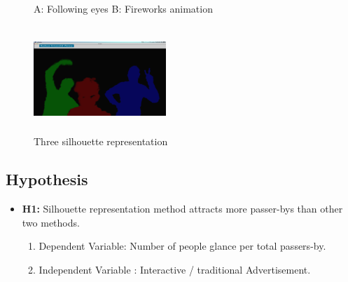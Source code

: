 \begin{figure}[!htb]
    \centering
    \hfill
    \caption{A: Following eyes  B: Fireworks animation }%
    \label{fig:Attraction_Attention}%
\end{figure}


\begin{figure}[H]
    \centering
    \includegraphics[width=50mm,height=40mm]{Figures/3/silhouttee}
    \caption{Three silhouette representation}%
    \label{fig:silhouttee}%
\end{figure}



\subsection{Hypothesis}

\begin{itemize}
\item \textbf{H1:} Silhouette representation method attracts more passer-bys than other two methods.
    
    \begin{enumerate}
        \item Dependent Variable: Number of people glance per total passers-by.
        \item Independent Variable : Interactive / traditional Advertisement.
    \end{enumerate}
        
\end{itemize}



